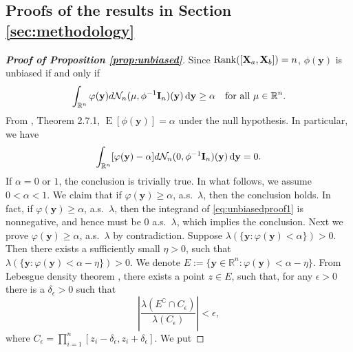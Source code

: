 \documentclass[11pt]{article}
\DeclareMathOperator{\myRank}{Rank}
\DeclareMathOperator{\myE}{E}
\newcommand{\By}{\mathbf{y}}    \newcommand{\Bz}{\mathbf{z}}
\theoremstyle{plain}
\theoremstyle{definition}
\theoremstyle{remark}
\begin{document}
\begin{appendices}

    \section{Proofs of the results in Section \ref{sec:methodology}}

\begin{proof}[\textbf{Proof of Proposition \ref{prop:unbiased}}]
    Since $\myRank([\BX_a,\BX_b])=n$, $\phi(\By)$ is unbiased if and only if
    \begin{equation*}
        \int_{\mathbb R^n} \varphi(\By) d\mathcal N_n (\mu,\phi^{-1} \BI_n) (\By) \,\mathrm{d} \By\geq \alpha
        \quad \text{for all } \mu\in \mathbb R^n.
    \end{equation*}
    From \cite{Lehmann}, Theorem 2.7.1, $\myE [\phi(\By)]=\alpha$ under the null hypothesis.
    In particular,
    we have
    \begin{equation}\label{eq:unbiasedproof1}
        \int_{\mathbb R^n} [\varphi(\By)-\alpha] d\mathcal N_n (0,\phi^{-1} \BI_n)(\By) \,\mathrm{d} \By=0.
    \end{equation}
    If $\alpha=0$ or $1$, the conclusion is trivially true.
    In what follows, we assume $0<\alpha<1$.
    We claim that if $\varphi(\By) \geq \alpha$, a.s.\ $\lambda$, then the conclusion holds.
    In fact, if $\varphi(\By) \geq \alpha$, a.s.\ $\lambda$,
    then the integrand of \eqref{eq:unbiasedproof1} is nonnegative, and hence must be $0$ a.s.\ $\lambda$, which implies the conclusion. 
    Next we prove $\varphi(\By) \geq \alpha$, a.s.\ $\lambda$ by contradiction. Suppose $\lambda(\{\By:\varphi (\By) <\alpha\})>0$.
    Then there exists a sufficiently small $\eta >0$, such that $\lambda(\{\By:\varphi (\By) <\alpha-\eta\})>0$.
    We denote $ E:=\{\By\in \mathbb R^n:\varphi (\By) <\alpha-\eta\}$.
    From Lebesgue density theorem \citep[Corollary 6.2.6]{book:992991}, there exists a point $z\in  E$, such that, for any $\epsilon >0$ there is a $\delta_{\epsilon}>0$ such that
    \begin{equation*}
        \left|\frac{\lambda(E^\complement\cap C_{\epsilon})}{\lambda(C_{\epsilon})}\right|<\epsilon,
    \end{equation*}
    where $C_{\epsilon}=\prod_{i=1}^n [z_i-\delta_{\epsilon}, z_i + \delta_{\epsilon}]$.
    We put

\end{proof}
\end{appendices}
\end{document}
